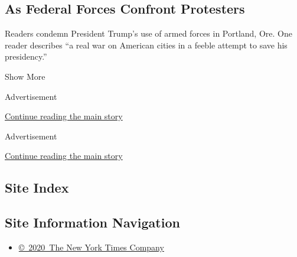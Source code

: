 \begin{enumerate}
  \hypertarget{as-federal-forces-confront-protesters}{%
  \subsection{As Federal Forces Confront
  Protesters}\label{as-federal-forces-confront-protesters}}

  Readers condemn President Trump's use of armed forces in Portland,
  Ore. One reader describes ``a real war on American cities in a feeble
  attempt to save his presidency.''
\end{enumerate}

Show More

Advertisement

\protect\hyperlink{after-mid1}{Continue reading the main story}

Advertisement

\protect\hyperlink{after-mktg}{Continue reading the main story}

\hypertarget{site-index}{%
\subsection{Site Index}\label{site-index}}

\hypertarget{site-information-navigation}{%
\subsection{Site Information
Navigation}\label{site-information-navigation}}

\begin{itemize}
\tightlist
\item
  \href{https://help.nytimes3xbfgragh.onion/hc/en-us/articles/115014792127-Copyright-notice}{©~2020~The
  New York Times Company}
\end{itemize}

